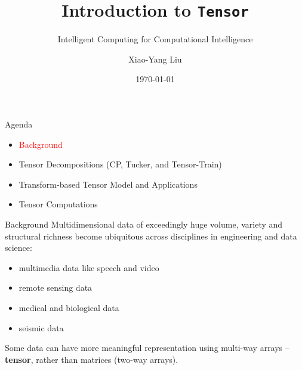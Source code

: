 \documentclass[t, 10pt, handout, aspectratio=169]{beamer}
\title[Introduction to Tensor]{Introduction to \texttt{Tensor}}
\subtitle{Intelligent Computing for Computational Intelligence}
\author[yanglet]{Xiao-Yang Liu}
\institute[CU]{Columbia University}
\date[\number\month/\number\day/\number\year]{\today}
\begin{document}
\begin{frame}
  \titlepage
\end{frame}

\begin{frame}{Agenda}
\begin{itemize}
    \large \item \textcolor{red}{Background}
    \large \item {Tensor Decompositions (CP, Tucker, and Tensor-Train)}
    \large \item{Transform-based Tensor Model and Applications}
    \large \item{Tensor Computations}
\end{itemize}
\end{frame}

\begin{frame}{Background}
\large Multidimensional data of exceedingly huge volume, variety and structural richness become ubiquitous across disciplines in engineering and data science:
\begin{itemize}
    \item multimedia data like speech and video
    \item remote sensing data
    \item medical and biological data
    \item seismic data
\end{itemize}
\margin
\large Some data can have more meaningful representation using multi-way arrays -- \textbf{tensor}, rather than matrices (two-way arrays).
\end{frame}
\end{document}
